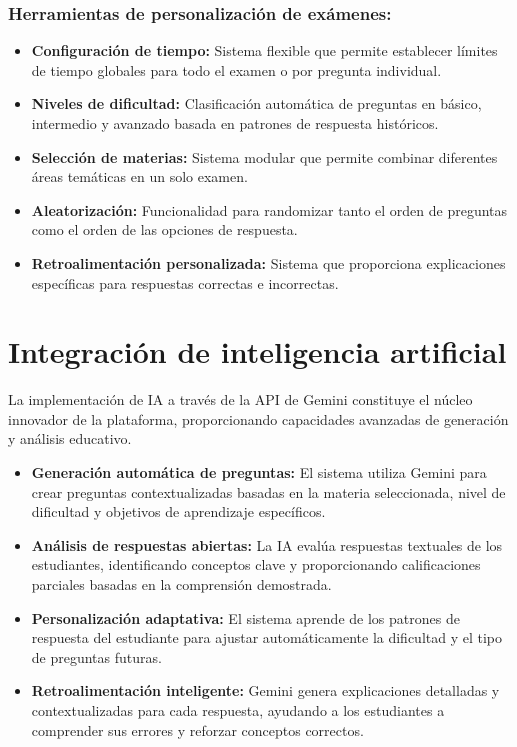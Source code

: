 \documentclass[12pt,a4paper]{report}
\begin{document}
\subsubsection{Herramientas de personalización de exámenes:}

\begin{itemize}
\item \textbf{Configuración de tiempo:} Sistema flexible que permite establecer límites de tiempo globales para todo el examen o por pregunta individual.

\item \textbf{Niveles de dificultad:} Clasificación automática de preguntas en básico, intermedio y avanzado basada en patrones de respuesta históricos.

\item \textbf{Selección de materias:} Sistema modular que permite combinar diferentes áreas temáticas en un solo examen.

\item \textbf{Aleatorización:} Funcionalidad para randomizar tanto el orden de preguntas como el orden de las opciones de respuesta.

\item \textbf{Retroalimentación personalizada:} Sistema que proporciona explicaciones específicas para respuestas correctas e incorrectas.
\end{itemize}

\section{Integración de inteligencia artificial}

La implementación de IA a través de la API de Gemini constituye el núcleo innovador de la plataforma, proporcionando capacidades avanzadas de generación y análisis educativo.

\begin{itemize}
\item \textbf{Generación automática de preguntas:} El sistema utiliza Gemini para crear preguntas contextualizadas basadas en la materia seleccionada, nivel de dificultad y objetivos de aprendizaje específicos.

\item \textbf{Análisis de respuestas abiertas:} La IA evalúa respuestas textuales de los estudiantes, identificando conceptos clave y proporcionando calificaciones parciales basadas en la comprensión demostrada.

\item \textbf{Personalización adaptativa:} El sistema aprende de los patrones de respuesta del estudiante para ajustar automáticamente la dificultad y el tipo de preguntas futuras.

\item \textbf{Retroalimentación inteligente:} Gemini genera explicaciones detalladas y contextualizadas para cada respuesta, ayudando a los estudiantes a comprender sus errores y reforzar conceptos correctos.
\end{itemize}
\end{document}
